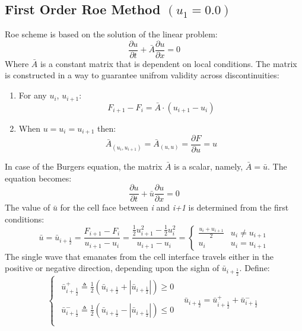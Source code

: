 \documentclass[11pt, a4paper]{article}
\begin{document}
\subsection{First Order Roe Method $(u_1 = 0.0)$}
Roe scheme is based on the solution of the linear problem:
\begin{equation}
        \displaystyle\frac{\partial u}{\partial t} + \bar{A}\frac{\partial u}{\partial x} = 0 
\end{equation}
Where $\bar{A}$ is a constant matrix that is dependent on local conditions. The matrix is constructed in a way to guarantee unifrom validity across discontinuities: 
\begin{enumerate}
    \item For any $u_i$, $u_{i+1}$:\begin{equation*}
        F_{i+1}-F_{i} = \bar{A}\cdot\left(u_{i+1}-u_i\right)
    \end{equation*}
    \item When $u=u_i=u_{i+1}$ then:\begin{equation*}
        \bar{A}_{\left(u_i,u_{i+1}\right)}=\bar{A}_{\left(u,u\right)}=\frac{\partial F}{\partial u}=u
    \end{equation*}
\end{enumerate}
In case of the Burgers equation, the matrix $\bar{A}$ is a scalar, namely, $\bar{A}=\bar{u}$. The equation becomes:
\begin{equation}
        \displaystyle\frac{\partial u}{\partial t} + \bar{u}\frac{\partial u}{\partial x} = 0 
\end{equation}
The value of $\bar{u}$ for the cell face between \emph{i} and \emph{i+1} is determined from the first conditions:
\begin{equation}
    \bar{u}=\bar{u}_{i+\frac{1}{2}}=\frac{F_{i+1}-F_i}{u_{i+1}-u_i}=\frac{\displaystyle\frac{1}{2}u_{i+1}^2-\frac{1}{2}u_i^2}{u_{i+1}-u_i}=\left\{\begin{array}{cc}
        \displaystyle\frac{u_i+u_{i+1}}{2} & u_i\neq u_{i+1} \\
        u_i & u_i=u_{i+1} 
    \end{array}\right.
\end{equation}
The single wave that emanates from the cell interface travels either in the positive or negative direction, depending upon the sighn of $\bar{u}_{i+\frac{1}{2}}$. Define:
\begin{equation}
    \left\{\begin{array}{cc}
        \begin{array}{c}
            \bar{u}_{i+\frac{1}{2}}^+\triangleq\displaystyle\frac{1}{2}\left(\bar{u}_{i+\frac{1}{2}}+\left|\bar{u}_{i+\frac{1}{2}}\right|\right)\geq0 \\\\
            \bar{u}_{i+\frac{1}{2}}^-\triangleq\displaystyle\frac{1}{2}\left(\bar{u}_{i+\frac{1}{2}}-\left|\bar{u}_{i+\frac{1}{2}}\right|\right)\leq0 \\
        \end{array} & \bar{u}_{i+\frac{1}{2}}=\bar{u}_{i+\frac{1}{2}}^++\bar{u}_{i+\frac{1}{2}}^-
    \end{array}\right.
\end{equation}
\end{document}
